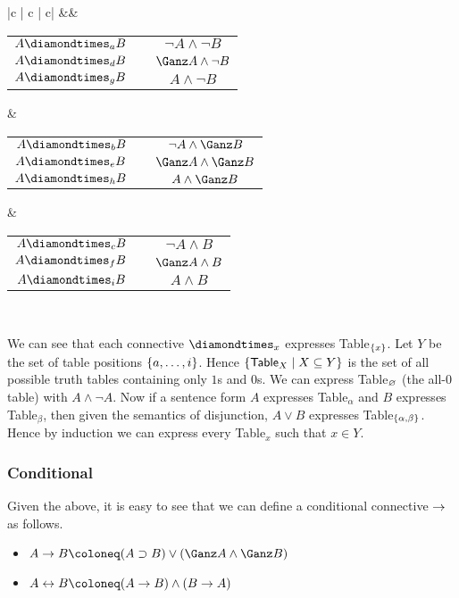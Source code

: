 \begin{singlespace}
\begin{longtable}{|c | c | c|}
	\cline{1-3}
	&& \vspace*{-10pt}\\
	\begin{tabular}{rlc}
	
		$A \Tpos_a B$ & \Defined & $\neg A \wedge \neg B$\\
		$A \Tpos_d B$ & \Defined & $\Gap A \wedge \neg B$\\
		$A \Tpos_g B$ & \Defined & $A \wedge \neg B$
	\end{tabular}
	&
	\begin{tabular}{r l c}
		$A \Tpos_b B$ & \Defined & $\neg A \wedge \Gap B$\\
		$A \Tpos_e B$ & \Defined & $\Gap A \wedge \Gap B$\\
		$A \Tpos_h B$ & \Defined & $A \wedge \Gap B$
	\end{tabular}
	&
	\begin{tabular}{r l c}
		$A \Tpos_c B$ & \Defined & $\neg A \wedge B$\\
		$A \Tpos_f B$ & \Defined & $\Gap A \wedge B$\\
		$A \Tpos_i B$ & \Defined & $A \wedge B$
	\end{tabular} \\
\end{longtable}
\end{singlespace}
\noindent We can see that each connective $\Tpos_x$ expresses \textsf{Table}$_{\left\{{x}\right\}}$. Let $Y$ be the set of table positions $\left\{{a,\dots,i}\right\}$. Hence $\left\{{\textsf{Table}_X \mid X \subseteq Y}\right\}$ is the set of all possible truth tables containing only $1$s and $0$s. We can express \textsf{Table}$_{\varnothing}$ (the all-$0$ table) with $A\wedge \neg A$. Now if a sentence form $A$ expresses \textsf{Table}$_\alpha$ and $B$ expresses \textsf{Table}$_\beta$, then given the semantics of disjunction, $A \vee B$ expresses \textsf{Table}$_{\left\{{\alpha,\beta}\right\}}$. Hence by induction we can express every \textsf{Table}$_x$ such that $x \in Y$.

\subsubsection{Conditional}\label{conditional}

Given the above, it is easy to see that we can define a conditional connective $\rightarrow$ as follows.

\begin{itemize}
\item $A\arrow B \Defined (A\supset B)\vee(\Gap A \wedge \Gap B)$
\item $A\biarrow B \Defined (A\arrow B)\wedge(B\arrow A)$
\end{itemize}

